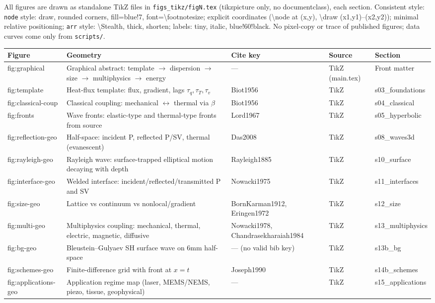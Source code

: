 \documentclass[12pt,a4paper]{article}
\begin{document}
All figures are drawn as standalone TikZ files in {\tt figs\_tikz/figN.tex} (tikzpicture only, no documentclass),  each section. Consistent style:
\texttt{node} style: draw, rounded corners, fill=blue!7, font=\textbackslash footnotesize; explicit coordinates (\textbackslash node at (x,y), \textbackslash draw (x1,y1)--(x2,y2)); minimal relative positioning;
\texttt{arr} style: \textbackslash Stealth, thick, shorten;
labels: tiny, italic, blue!60!black. No pixel-copy or trace of published figures; data curves come only from {\tt scripts/}.

\begin{tabularx}{\textwidth}{@{}lXllX@{}}\toprule
\textbf{Figure} & \textbf{Geometry} & \textbf{Cite key} & \textbf{Source} & \textbf{Section}\\\midrule
fig:graphical & Graphical abstract: template $\to$ dispersion $\to$ size $\to$ multiphysics $\to$ energy & --- & TikZ (main.tex) & Front matter\\
fig:template & Heat-flux template: flux, gradient, lags $\tau_q,\tau_T,\tau_v$ & Biot1956 & TikZ & s03\_foundations\\
fig:classical-coup & Classical coupling: mechanical $\leftrightarrow$ thermal via $\beta$ & Biot1956 & TikZ & s04\_classical\\
fig:fronts & Wave fronts: elastic-type and thermal-type fronts from source & Lord1967 & TikZ & s05\_hyperbolic\\
fig:reflection-geo & Half-space: incident P, reflected P/SV, thermal (evanescent) & Das2008 & TikZ & s08\_waves3d\\
fig:rayleigh-geo & Rayleigh wave: surface-trapped elliptical motion decaying with depth & Rayleigh1885 & TikZ & s10\_surface\\
fig:interface-geo & Welded interface: incident/reflected/transmitted P and SV & Nowacki1975 & TikZ & s11\_interfaces\\
fig:size-geo & Lattice vs continuum vs nonlocal/gradient & BornKarman1912, Eringen1972 & TikZ & s12\_size\\
fig:multi-geo & Multiphysics coupling: mechanical, thermal, electric, magnetic, diffusive & Nowacki1978, Chandrasekharaiah1984 & TikZ & s13\_multiphysics\\
fig:bg-geo & Bleustein--Gulyaev SH surface wave on 6mm half-space & --- (no valid bib key) & TikZ & s13b\_bg\\
fig:schemes-geo & Finite-difference grid with front at $x=t$ & Joseph1990 & TikZ & s14b\_schemes\\
fig:applications-geo & Application regime map (laser, MEMS/NEMS, piezo, tissue, geophysical) & --- & TikZ & s15\_applications\\
\bottomrule
\end{tabularx}
\end{document}
